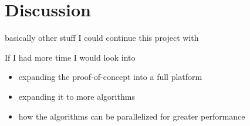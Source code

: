 \section{Discussion}

basically other stuff I could continue this project with

If I had more time I would look into

\begin{itemize}
    \item
          expanding the proof-of-concept into a full platform
    \item
          expanding it to more algorithms
    \item
          how the algorithms can be parallelized for greater performance
\end{itemize}
